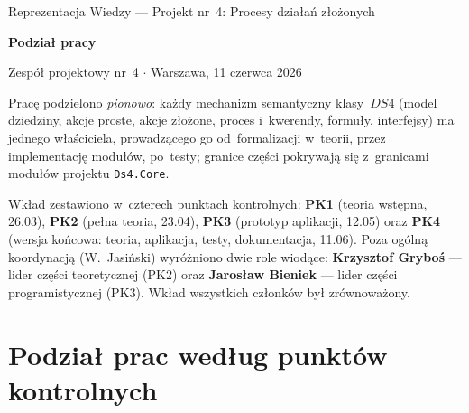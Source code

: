\documentclass[11pt,a4paper]{article}
\begin{document}
\sloppy

\begin{center}
  {\Large Reprezentacja Wiedzy --- Projekt nr~4: Procesy działań złożonych\par}
  \vspace{0.4em}
  {\huge \bfseries Podział pracy\par}
  \vspace{0.4em}
  {\large Zespół projektowy nr~4 \quad $\cdot$ \quad Warszawa, 11 czerwca 2026\par}
\end{center}

\vspace{1.2em}

Pracę podzielono \emph{pionowo}: każdy mechanizm semantyczny klasy~$\mathit{DS4}$
(model dziedziny, akcje proste, akcje złożone, proces i~kwerendy, formuły,
interfejsy) ma jednego właściciela, prowadzącego go od~formalizacji w~teorii,
przez implementację modułów, po~testy; granice części pokrywają się z~granicami
modułów projektu \texttt{Ds4.Core}.

Wkład zestawiono w~czterech punktach kontrolnych: \textbf{PK1} (teoria wstępna,
26.03), \textbf{PK2} (pełna teoria, 23.04), \textbf{PK3} (prototyp aplikacji,
12.05) oraz \textbf{PK4} (wersja końcowa: teoria, aplikacja, testy,
dokumentacja, 11.06). Poza ogólną koordynacją (W.~Jasiński) wyróżniono dwie
role wiodące: \textbf{Krzysztof Gryboś} --- lider części teoretycznej (PK2)
oraz \textbf{Jarosław Bieniek} --- lider części programistycznej (PK3). Wkład
wszystkich członków był zrównoważony.

\section*{Podział prac według punktów kontrolnych}
\end{document}
